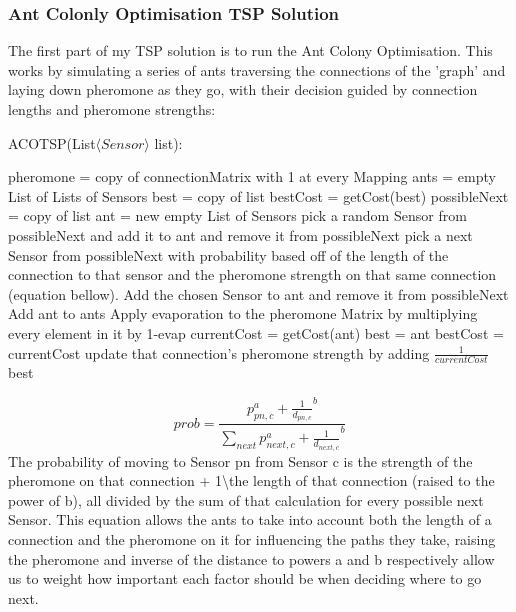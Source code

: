 \documentclass[12pt]{article}
\begin{document}
\subsubsection{Ant Colonly Optimisation TSP Solution}
The first part of my TSP solution is to run the Ant Colony Optimisation. This works by simulating a series of ants traversing the connections of the 'graph' and laying down pheromone as they go, with their decision guided by connection lengths and pheromone strengths:
\begin{algorithm}
\caption{ACOTSP(List$\langle Sensor \rangle$ list):}
\begin{algorithmic}[1]
 \STATE pheromone = copy of connectionMatrix with 1 at every Mapping
 \STATE ants = empty List of Lists of Sensors
 \STATE best = copy of list
 \State bestCost = getCost(best)
 \STATE possibleNext = copy of list
 \STATE ant = new empty List of Sensors
 \STATE pick a random Sensor from possibleNext and add it to ant and remove it from possibleNext
 \STATE pick a next Sensor from possibleNext with probability based off of the length of the connection to that sensor and the pheromone strength on that same connection (equation bellow).
 \STATE Add the chosen Sensor to ant and remove it from possibleNext
 \ENDWHILE
 \STATE Add ant to ants
 \ENDFOR
 \STATE Apply evaporation to the pheromone Matrix by multiplying every element in it by 1-evap
 \STATE currentCost = getCost(ant)
 \STATE best = ant
 \STATE bestCost = currentCost
 \ENDIF
 \STATE update that connection's pheromone strength by adding $\frac{1}{currentCost}$
 \ENDFOR
 \ENDFOR
 \RETURN best
 \ENDFOR
\end{algorithmic}
\end{algorithm}

\[prob = \frac{p_{pn, c}^a + \frac{1}{d_{pn, c}}^b}{\sum_{next} p_{next, c}^a + \frac{1}{d_{next, c}}^b}\]
The probability of moving to Sensor pn from Sensor c is the strength of the pheromone on that connection + 1\textbackslash the length of that connection (raised to the power of b), all divided by the sum of that calculation for every possible next Sensor. This equation allows the ants to take into account both the length of a connection and the pheromone on it for influencing the paths they take, raising the pheromone and inverse of the distance to powers a and b respectively allow us to weight how important each factor should be when deciding where to go next.
\end{document}
